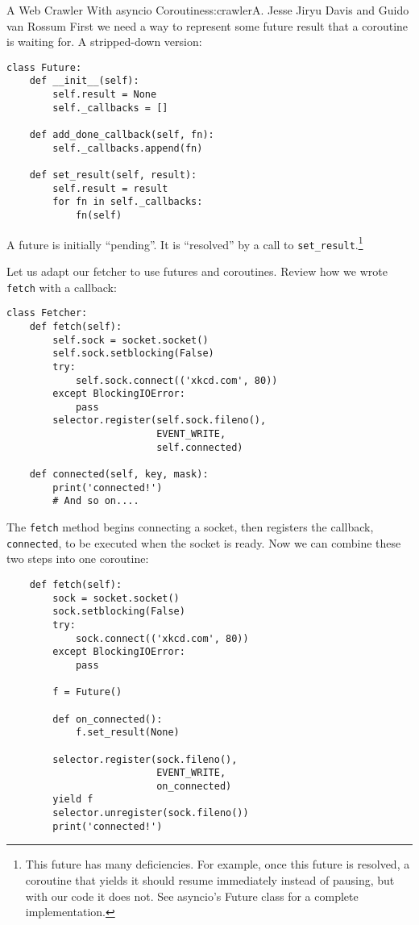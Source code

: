 \begin{aosachapter}{A Web Crawler With asyncio Coroutines}{s:crawler}{A. Jesse Jiryu Davis and Guido van Rossum}
First we need a way to represent some future result that a coroutine is
waiting for. A stripped-down version:

\begin{verbatim}
class Future:
    def __init__(self):
        self.result = None
        self._callbacks = []

    def add_done_callback(self, fn):
        self._callbacks.append(fn)

    def set_result(self, result):
        self.result = result
        for fn in self._callbacks:
            fn(self)
\end{verbatim}

A future is initially ``pending''. It is ``resolved'' by a call to
\texttt{set\_result}.\footnote{This future has many deficiencies. For
  example, once this future is resolved, a coroutine that yields it
  should resume immediately instead of pausing, but with our code it
  does not. See asyncio's Future class for a complete implementation.}

Let us adapt our fetcher to use futures and coroutines. Review how we
wrote \texttt{fetch} with a callback:

\begin{verbatim}
class Fetcher:
    def fetch(self):
        self.sock = socket.socket()
        self.sock.setblocking(False)
        try:
            self.sock.connect(('xkcd.com', 80))
        except BlockingIOError:
            pass
        selector.register(self.sock.fileno(),
                          EVENT_WRITE,
                          self.connected)

    def connected(self, key, mask):
        print('connected!')
        # And so on....
\end{verbatim}

The \texttt{fetch} method begins connecting a socket, then registers the
callback, \texttt{connected}, to be executed when the socket is ready.
Now we can combine these two steps into one coroutine:

\begin{verbatim}
    def fetch(self):
        sock = socket.socket()
        sock.setblocking(False)
        try:
            sock.connect(('xkcd.com', 80))
        except BlockingIOError:
            pass

        f = Future()

        def on_connected():
            f.set_result(None)

        selector.register(sock.fileno(),
                          EVENT_WRITE,
                          on_connected)
        yield f
        selector.unregister(sock.fileno())
        print('connected!')
\end{verbatim}


\end{aosachapter}

